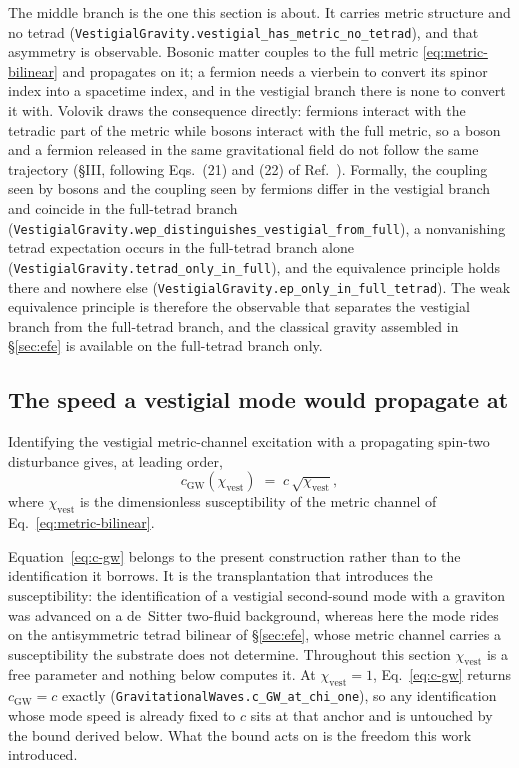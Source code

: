 \documentclass[aps,prd,nofootinbib,superscriptaddress,12pt]{revtex4-2}
\DeclareRobustCommand{\lb}{\discretionary{}{}{}}
\begin{document}
The middle branch is the one this section is about. It carries metric
structure and no tetrad
(\texttt{Vestigial\lb{}Gravity.\lb{}vestigial\_\lb{}has\_\lb{}metric\_\lb{}no\_\lb{}tetrad}), and that
asymmetry is observable. Bosonic matter couples to the full metric
\eqref{eq:metric-bilinear} and propagates on it; a fermion needs a
vierbein to convert its spinor index into a spacetime index, and in the
vestigial branch there is none to convert it with. Volovik draws the
consequence directly: fermions interact with the tetradic part of the
metric while bosons interact with the full metric, so a boson and a
fermion released in the same gravitational field do not follow the same
trajectory (\S III, following Eqs.~(21) and (22) of
Ref.~\cite{Volovik2024Vestigial}). Formally, the coupling seen by bosons
and the coupling seen by fermions differ in the vestigial branch and
coincide in the full-tetrad branch
(\texttt{Vestigial\lb{}Gravity.\lb{}wep\_\lb{}distinguishes\_\lb{}vestigial\_\lb{}from\_\lb{}full}), a
nonvanishing tetrad expectation occurs in the full-tetrad branch alone
(\texttt{Vestigial\lb{}Gravity.\lb{}tetrad\_\lb{}only\_\lb{}in\_\lb{}full}), and the equivalence
principle holds there and nowhere else
(\texttt{Vestigial\lb{}Gravity.\lb{}ep\_\lb{}only\_\lb{}in\_\lb{}full\_\lb{}tetrad}). The weak
equivalence principle is therefore the observable that separates the
vestigial branch from the full-tetrad branch, and the classical gravity
assembled in \S\ref{sec:efe} is available on the full-tetrad branch only.

\subsection{The speed a vestigial mode would propagate at}
\label{sec:vestigial-speed}

Identifying the vestigial metric-channel excitation with a propagating
spin-two disturbance gives, at leading order,
\begin{equation}
\label{eq:c-gw}
c_{\mathrm{GW}}(\chi_{\mathrm{vest}}) \;=\;
c\,\sqrt{\chi_{\mathrm{vest}}} ,
\end{equation}
\noindent
where $\chi_{\mathrm{vest}}$ is the dimensionless susceptibility of the
metric channel of Eq.~\eqref{eq:metric-bilinear}.

Equation~\eqref{eq:c-gw} belongs to the present construction rather than
to the identification it borrows. It is the transplantation that
introduces the susceptibility: the identification of a vestigial
second-sound mode with a graviton was advanced on a de~Sitter two-fluid
background, whereas here the mode rides on the antisymmetric tetrad
bilinear of \S\ref{sec:efe}, whose metric channel carries a
susceptibility the substrate does not determine. Throughout this section
$\chi_{\mathrm{vest}}$ is a free parameter and nothing below computes it.
At $\chi_{\mathrm{vest}} = 1$, Eq.~\eqref{eq:c-gw} returns
$c_{\mathrm{GW}} = c$ exactly
(\texttt{Gravitational\lb{}Waves.\lb{}c\_\lb{}GW\_\lb{}at\_\lb{}chi\_\lb{}one}), so any identification
whose mode speed is already fixed to $c$ sits at that anchor and is
untouched by the bound derived below. What the bound acts on is the
freedom this work introduced.
\end{document}
